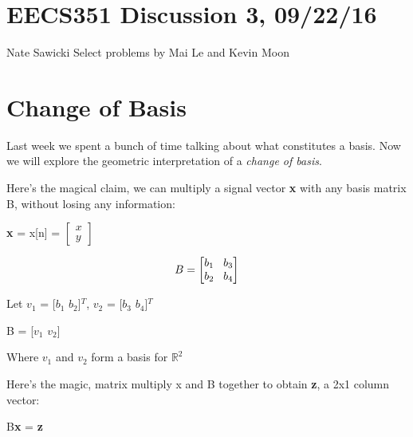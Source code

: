 \documentclass[11pt]{article}
\begin{document}
\section*{EECS351 Discussion 3, 09/22/16}
Nate Sawicki \newline
Select problems by Mai Le and Kevin Moon

\section{Change of Basis}
Last week we spent a bunch of time talking about what constitutes a basis. Now we will explore the geometric interpretation of a \emph{change of basis}.

\vspace{5mm}
Here's the magical claim, we can multiply a signal vector \textbf{x} with any basis matrix B, without losing any information:

\begin{center}

\textbf{x} = x[n] = 
$
\begin{bmatrix}

x \\
y

\end{bmatrix}
$
\end{center}

\vspace{5mm}

\begin{center}
\[
B = 
\begin{bmatrix}
   b_1  \hspace{3mm}   b_3 \\
   b_2 \hspace{3mm}   b_4            
\end{bmatrix}
\]
\end{center}

Let $v_1$ = [$b_1$ $b_2$]$^T$, $v_2$ = [$b_3$ $b_4$]$^T$

\vspace{4mm}
\begin{center}
B =  [\textbf{$v_1$} \textbf{$v_2$}] 

\end{center}



Where $v_1$ and $v_2$ form a basis for $\mathbb{R}^2$
\vspace{4mm}

Here's the magic, matrix multiply x and B together to obtain \textbf{z}, a 2x1 column vector:
\vspace{2mm}
\begin{center}

B\textbf{x} = \textbf{z}
\end{center}
\end{document}
